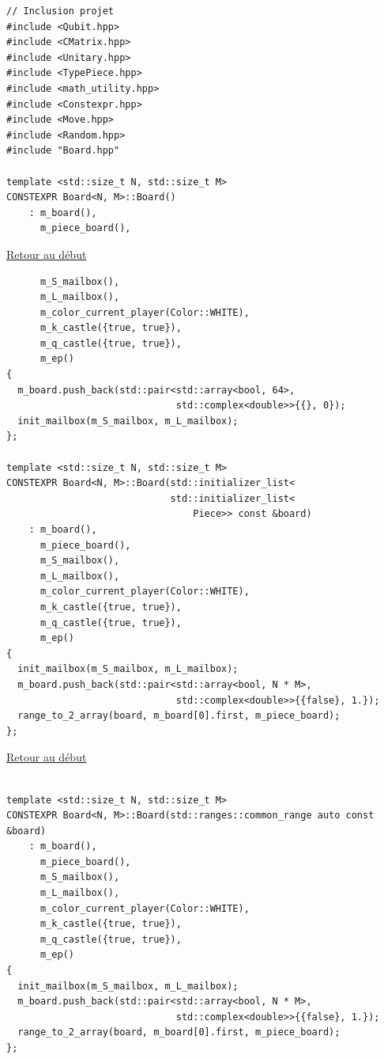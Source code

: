 {\begin{frame}[fragile]
\begin{verbatim}
// Inclusion projet
#include <Qubit.hpp>
#include <CMatrix.hpp>
#include <Unitary.hpp>
#include <TypePiece.hpp>
#include <math_utility.hpp>
#include <Constexpr.hpp>
#include <Move.hpp>
#include <Random.hpp>
#include "Board.hpp"

template <std::size_t N, std::size_t M>
CONSTEXPR Board<N, M>::Board()
    : m_board(),
      m_piece_board(),
\end{verbatim}
\end{frame}

\begin{frame}[fragile]
\hyperlink{conclusion}{Retour au début}\newline
\begin{verbatim}
      m_S_mailbox(),
      m_L_mailbox(),
      m_color_current_player(Color::WHITE),
      m_k_castle({true, true}),
      m_q_castle({true, true}),
      m_ep()
{
  m_board.push_back(std::pair<std::array<bool, 64>,
                              std::complex<double>>{{}, 0});
  init_mailbox(m_S_mailbox, m_L_mailbox);
};

template <std::size_t N, std::size_t M>
CONSTEXPR Board<N, M>::Board(std::initializer_list<
                             std::initializer_list<
                                 Piece>> const &board)
    : m_board(),
      m_piece_board(),
      m_S_mailbox(),
      m_L_mailbox(),
      m_color_current_player(Color::WHITE),
      m_k_castle({true, true}),
      m_q_castle({true, true}),
      m_ep()
{
  init_mailbox(m_S_mailbox, m_L_mailbox);
  m_board.push_back(std::pair<std::array<bool, N * M>,
                              std::complex<double>>{{false}, 1.});
  range_to_2_array(board, m_board[0].first, m_piece_board);
};
\end{verbatim}
\end{frame}

\begin{frame}[fragile]
\hyperlink{conclusion}{Retour au début}\newline
\begin{verbatim}

template <std::size_t N, std::size_t M>
CONSTEXPR Board<N, M>::Board(std::ranges::common_range auto const &board)
    : m_board(),
      m_piece_board(),
      m_S_mailbox(),
      m_L_mailbox(),
      m_color_current_player(Color::WHITE),
      m_k_castle({true, true}),
      m_q_castle({true, true}),
      m_ep()
{
  init_mailbox(m_S_mailbox, m_L_mailbox);
  m_board.push_back(std::pair<std::array<bool, N * M>,
                              std::complex<double>>{{false}, 1.});
  range_to_2_array(board, m_board[0].first, m_piece_board);
};


\end{verbatim}
\end{frame}}
